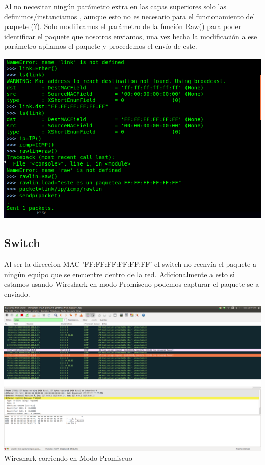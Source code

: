 \documentclass[spanish]{udpreport}
\begin{document}
Al no necesitar ningún parámetro extra en las capas superiores solo las definimos/instanciamos , aunque esto no es necesario para el funcionamiento del paquete (?). Solo modificamos el parámetro de la función Raw() para poder identificar el paquete que nosotros enviamos, una vez hecha la modificación a ese parámetro apilamos el paquete y procedemos el envío de este.

\begin{center}
	\includegraphics[scale=.37]{imagenes/Switch/Test_1b.png}
\end{center}

\pagebreak

\subsection{Switch}

Al ser la direccion MAC 'FF:FF:FF:FF:FF:FF' el switch no reenvía el paquete a ningún equipo que se encuentre dentro de la red. Adicionalmente a esto si estamos usando Wireshark en modo Promiscuo podemos capturar el paquete se a enviado.

\begin{center}
	\includegraphics[scale=.21]{imagenes/Switch/FF.png}
	\\ Wireshark corriendo en Modo Promiscuo
\end{center}
\end{document}
